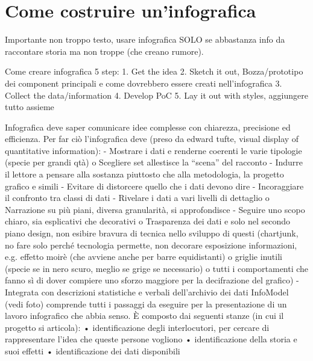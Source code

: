 \section{Come costruire un'infografica}
Importante non troppo testo, usare infografica SOLO se abbastanza info da raccontare storia ma non troppe (che creano rumore).

Come creare infografica
5 step:
1.	Get the idea
2.	Sketch it out, Bozza/prototipo dei component principali e come dovrebbero essere creati nell'infografica
3.	Collect the data/information
4.	Develop PoC
5.	Lay it out with styles, aggiungere tutto assieme

Infografica deve saper comunicare idee complesse con chiarezza, precisione ed efficienza. Per far ciò l'infografica deve (preso da edward tufte, visual display of quantitative information):
-	Mostrare i dati e renderne coerenti le varie tipologie (specie per grandi qtà)
    o	Scegliere set allestisce la “scena” del racconto
-	Indurre il lettore a pensare alla sostanza piuttosto che alla metodologia, la progetto grafico e simili
-	Evitare di distorcere quello che i dati devono dire
-	Incoraggiare il confronto tra classi di dati
-	Rivelare i dati a vari livelli di dettaglio
    o	Narrazione su più piani, diversa granularità, si approfondisce 
-	Seguire uno scopo chiaro, sia esplicativi che decorativi
    o	Trasparenza dei dati e solo nel secondo piano design, non esibire bravura di tecnica nello sviluppo di questi (chartjunk, no fare solo perché tecnologia permette, non decorare esposizione informazioni, e.g. effetto moirè (che avviene anche per barre equidistanti) o griglie inutili (specie se in nero scuro, meglio se grige se necessario) o tutti i comportamenti che fanno sì di dover compiere uno sforzo maggiore per la decifrazione del grafico)
-	Integrata con descrizioni statistiche e verbali dell'archivio dei dati
InfoModel (vedi foto) comprende tutti i passaggi da eseguire per la presentazione di un lavoro infografico che abbia senso. È composto dai seguenti stanze (in cui il progetto si articola):
•	identificazione degli interlocutori, per cercare di rappresentare l'idea che queste persone vogliono
•	identificazione della storia e suoi effetti
•	identificazione dei dati disponibili
